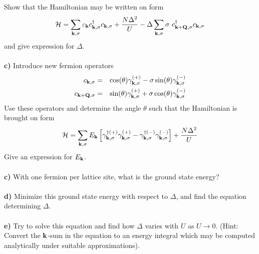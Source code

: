 \begin{problem}
\ \\
\ \\
Show that the Hamiltonian may be written on form
\begin{eqnarray}
	\mathcal{H} = \sum_{{\bf k},\sigma}  {\varepsilon_{{\bf k}}}  c^{\dagger}_{{\bf k},\sigma} c_{{\bf k},\sigma} + \frac{N \Delta^2}{U} 
	- \Delta \sum_{{\bf k},\sigma} \sigma  ~ c^{\dagger}_{{\bf k}+{\bf Q},\sigma} c_{{\bf k},\sigma}  \nonumber
\end{eqnarray} 
and give expression for $\Delta$.
\ \\
\ \\
{\bf c)} Introduce new fermion operators
\begin{eqnarray}
	c_{{\bf k},\sigma} & = & \cos(\theta) \gamma^{(+)}_{{\bf k},\sigma} - \sigma \sin(\theta) \gamma^{(-)}_{{\bf k},\sigma} \nonumber \\
	c_{{\bf k}+{\bf Q},\sigma} & = & \sin(\theta) \gamma^{(+)}_{{\bf k},\sigma} + \sigma \cos(\theta) \gamma^{(-)}_{{\bf k},\sigma} \nonumber 
\end{eqnarray}
Use these operators and determine the angle $\theta$ such that the Hamiltonian is brought on form
\begin{eqnarray}
	\mathcal{H} = \sum_{{\bf k}, \sigma} E_{\bf k} \left[ \gamma^{\dagger (+)}_{{\bf k},\sigma}    \gamma^{(+)}_{{\bf k},\sigma}  
	-  \gamma^{\dagger (-)}_{{\bf k},\sigma}    \gamma^{(-)}_{{\bf k},\sigma}  \right] + \frac{N \Delta^2}{U} \nonumber
\end{eqnarray} 
Give an expression for $E_{\bf k}$.
\ \\
\ \\
{\bf c)} With one fermion per lattice site, what is the ground state energy? 
\ \\
\ \\
{\bf d)} Minimize this ground state energy with respect to $\Delta$, and find the equation determining $\Delta$.
\ \\
\ \\
{\bf e)} Try to solve this equation and find how $\Delta$ varies with $U$ as $U \to 0$. (Hint: Convert the ${\bf k}$-sum in the equation to an energy integral which may be computed analytically under suitable approximations).  
\ \\
\ \\
\end{problem}